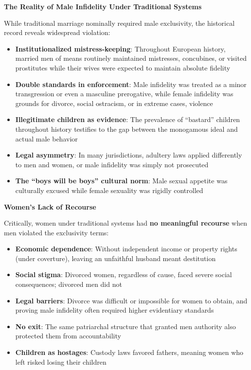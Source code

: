 \documentclass[12pt, letterpaper]{article}
\begin{document}
\textbf{The Reality of Male Infidelity Under Traditional Systems}

While traditional marriage nominally required male exclusivity, the historical record reveals widespread violation:

\begin{itemize}
    \item \textbf{Institutionalized mistress-keeping}: Throughout European history, married men of means routinely maintained mistresses, concubines, or visited prostitutes while their wives were expected to maintain absolute fidelity
    \item \textbf{Double standards in enforcement}: Male infidelity was treated as a minor transgression or even a masculine prerogative, while female infidelity was grounds for divorce, social ostracism, or in extreme cases, violence
    \item \textbf{Illegitimate children as evidence}: The prevalence of ``bastard'' children throughout history testifies to the gap between the monogamous ideal and actual male behavior
    \item \textbf{Legal asymmetry}: In many jurisdictions, adultery laws applied differently to men and women, or male infidelity was simply not prosecuted
    \item \textbf{The ``boys will be boys'' cultural norm}: Male sexual appetite was culturally excused while female sexuality was rigidly controlled
\end{itemize}

\textbf{Women's Lack of Recourse}

Critically, women under traditional systems had \textbf{no meaningful recourse} when men violated the exclusivity terms:

\begin{itemize}
    \item \textbf{Economic dependence}: Without independent income or property rights (under coverture), leaving an unfaithful husband meant destitution
    \item \textbf{Social stigma}: Divorced women, regardless of cause, faced severe social consequences; divorced men did not
    \item \textbf{Legal barriers}: Divorce was difficult or impossible for women to obtain, and proving male infidelity often required higher evidentiary standards
    \item \textbf{No exit}: The same patriarchal structure that granted men authority also protected them from accountability
    \item \textbf{Children as hostages}: Custody laws favored fathers, meaning women who left risked losing their children
\end{itemize}
\end{document}
